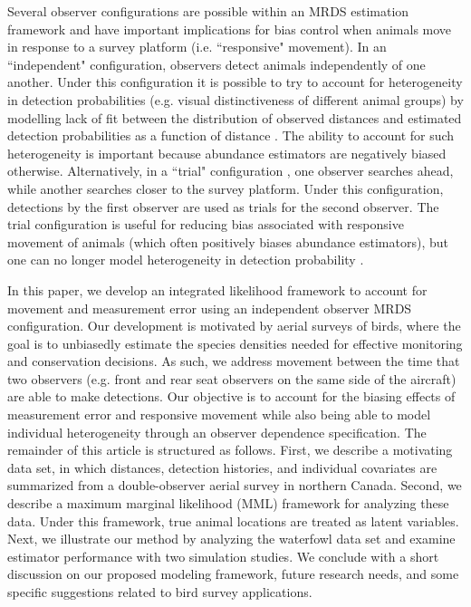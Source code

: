 \documentclass[aoas,preprint]{imsart}
\numberwithin{equation}{section}
\theoremstyle{plain}
\begin{document}
Several observer configurations are possible within an MRDS estimation framework \citep{BurtEtAl2014} and have important implications for bias control when animals move in response to a survey platform (i.e. ``responsive" movement).  In an ``independent" configuration, observers detect animals independently of one another.  Under this configuration it is possible to try to account for heterogeneity in detection probabilities (e.g. visual distinctiveness of different animal groups) by modelling lack of fit between the distribution of observed distances and estimated detection probabilities as a function of distance \citep{LaakeBorchers2004,BorchersEtAl2006,BucklandEtAl2010}.  The ability to account for such heterogeneity is important because abundance estimators are negatively biased otherwise. Alternatively, in a ``trial" configuration \citep{BucklandTurnock1992}, one observer searches ahead, while another searches closer to the survey platform.  Under this configuration, detections by the first observer are used as trials for the second observer.  The trial configuration is useful for reducing bias associated with responsive movement of animals (which often positively biases abundance estimators), but one can no longer model heterogeneity in detection probability \citep{BurtEtAl2014}.

In this paper, we develop an integrated likelihood framework to account for movement and measurement error using an independent observer MRDS configuration. Our development is motivated by aerial surveys of birds, where the goal is to unbiasedly estimate the species densities needed for effective monitoring and conservation decisions. As such, we address movement between the time that two observers (e.g. front and rear seat observers on the same side of the aircraft) are able to make detections.  Our objective is to account for the biasing effects of measurement error and responsive movement while also being able to model individual heterogeneity through an observer dependence specification.  The remainder of this article is structured as follows.  First, we describe a motivating data set, in which distances, detection histories, and individual covariates are summarized from a double-observer aerial survey in northern Canada.  Second, we describe a maximum marginal likelihood (MML) framework for analyzing these data.  Under this framework, true animal locations are treated as latent variables.  Next, we illustrate our method by analyzing the waterfowl data set and examine estimator performance with two simulation studies.  We conclude with a short discussion on our proposed modeling framework, future research needs, and some specific suggestions related to bird survey applications.
\end{document}
